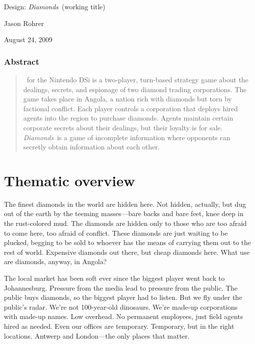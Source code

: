 
\newcommand{\gtitle}{{\it Diamonds}}

\newcommand{\rc}{resource}
\newcommand{\rcs}{resources}
\newcommand{\Rc}{Resource}
\newcommand{\Rcs}{Resources}


{\centering 
{\huge Design: \gtitle\ (working title)}

{\large Jason Rohrer}

{\large August 24, 2009}

}


\subsubsection*{\centering Abstract}
\begin{quotation}
\noindent \gtitle\ for the Nintendo DSi is a two-player, turn-based strategy game about the dealings, secrets, and espionage of two diamond trading corporations.  The game takes place in Angola, a nation rich with diamonds but torn by factional conflict.  Each player controls a corporation that deploys hired agents into the region to purchase diamonds.  Agents maintain certain corporate secrets about their dealings, but their loyalty is for sale.  \gtitle\ is a game of incomplete information where opponents can secretly obtain information about each other.
\end{quotation}


\section{Thematic overview}

The finest diamonds in the world are hidden here.  Not hidden, actually, but dug out of the earth by the teeming masses---bare backs and bare feet, knee deep in the rust-colored mud.  The diamonds are hidden only to those who are too afraid to come here, too afraid of conflict.  These diamonds are just waiting to be plucked, begging to be sold to whoever has the means of carrying them out to the rest of world.  Expensive diamonds out there, but cheap diamonds here.  What use are diamonds, anyway, in Angola?

The local market has been soft ever since the biggest player went back to Johannesburg.   Pressure from the media lead to pressure from the public.  The public buys diamonds, so the biggest player had to listen.  But we fly under the public's radar.  We're not 100-year-old dinosaurs.  We're made-up corporations with made-up names.  Low overhead.  No permanent employees, just field agents hired as needed.  Even our offices are temporary.  Temporary, but in the right locations.  Antwerp and London---the only places that matter.

